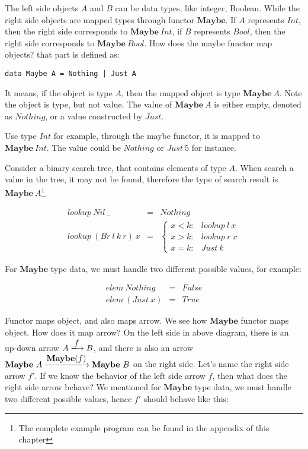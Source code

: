 \documentclass{article}
\begin{document}
\begin{example}
The left side objects $A$ and $B$ can be data types, like integer, Boolean. While the right side objects are mapped types through functor $\mathbf{Maybe}$. If $A$ represents $Int$, then the right side corresponds to $\mathbf{Maybe}\ Int$, if $B$ represents $Bool$, then the right side corresponds to $\mathbf{Maybe}\ Bool$. How does the maybe functor map objects? that part is defined as:

\lstset{frame=none}
\begin{lstlisting}
data Maybe A = Nothing | Just A
\end{lstlisting}

It means, if the object is type $A$, then the mapped object is type $\mathbf{Maybe}\ A$. Note the object is type, but not value. The value of $\mathbf{Maybe}\ A$ is either empty, denoted as $Nothing$, or a value constructed by $Just$.

Use type $Int$ for example, through the maybe functor, it is mapped to $\mathbf{Maybe}\ Int$. The value could be $Nothing$ or $Just\ 5$ for instance.

Consider a binary search tree, that contains elements of type $A$. When search a value in the tree, it may not be found, therefore the type of search result is $\mathbf{Maybe}\ A$\footnote{The complete example program can be found in the appendix of this chapter}.

\[
\begin{array}{rcl}
lookup\ Nil\ \_ & = & Nothing \\
lookup\ (Br\ l\ k\ r)\ x & = & \begin{cases}
  x < k: & lookup\ l\ x \\
  x > k: & lookup\ r\ x \\
  x = k: & Just\ k
\end{cases}
\end{array}
\]

For $\mathbf{Maybe}$ type data, we must handle two different possible values, for example:

\[
\begin{array}{lcl}
elem\ Nothing & = & False \\
elem\ (Just\ x) & = & True
\end{array}
\]

Functor maps object, and also maps arrow. We see how $\mathbf{Maybe}$ functor maps object. How does it map arrow? On the left side in above diagram, there is an up-down arrow $A \arrowto{f} B$, and there is also an arrow $\mathbf{Maybe}\ A \arrowto{\mathbf{Maybe}(f)} \mathbf{Maybe}\ B$ on the right side. Let's name the right side arrow $f'$. If we know the behavior of the left side arrow $f$, then what does the right side arrow behave? We mentioned for $\mathbf{Maybe}$ type data, we must handle two different possible values, hence $f'$ should behave like this:


\end{example}
\end{document}
